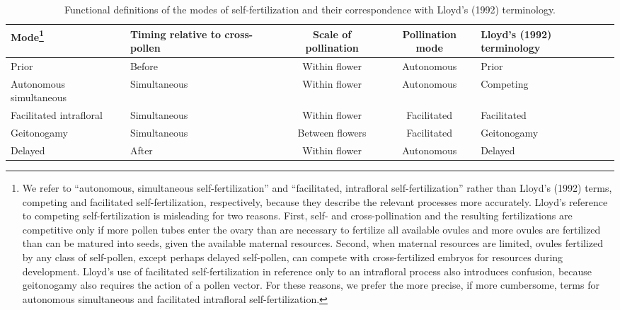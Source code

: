 \documentclass[letterpaper,titlepage]{scrartcl}
\begin{document}
\begin{table}[p]
\begin{minipage}{\textwidth}
  \begin{tabular}{p{2.3cm}p{3cm}ccp{3cm}}
    \hline
    Mode\footnote{We refer to ``autonomous, simultaneous
      self-fertilization'' and ``facilitated, intrafloral
      self-fertilization'' rather than Lloyd's (1992) terms, competing and
      facilitated self-fertilization, respectively, because they describe
      the relevant processes more accurately. Lloyd's reference to
      competing self-fertilization is misleading for two reasons. First,
      self- and cross-pollination and the resulting fertilizations are
      competitive only if more pollen tubes enter the ovary than are
      necessary to fertilize all available ovules and more ovules are
      fertilized than can be matured into seeds, given the available
      maternal resources. Second, when maternal resources are limited,
      ovules fertilized by any class of self-pollen, except perhaps
      delayed self-pollen, can compete with cross-fertilized embryos for
      resources during development. Lloyd's use of facilitated
      self-fertilization in reference only to an intrafloral process also
      introduces confusion, because geitonogamy also requires the action
      of a pollen vector. For these reasons, we prefer the more precise,
      if more cumbersome, terms for autonomous simultaneous and
      facilitated intrafloral self-fertilization.} & Timing relative to cross-pollen & Scale of pollination & Pollination mode & Lloyd's (1992) terminology\\
    \hline
    Prior & Before & Within flower & Autonomous & Prior\\
    Autonomous simultaneous & Simultaneous & Within flower & Autonomous & Competing\\
    Facilitated intrafloral & Simultaneous & Within flower & Facilitated & Facilitated\\
    Geitonogamy  & Simultaneous & Between flowers & Facilitated & Geitonogamy\\
    Delayed & After & Within flower & Autonomous & Delayed\\
    \hline
  \end{tabular}
  \caption{Functional definitions of the modes of self-fertilization and their correspondence with Lloyd's (1992) terminology.}
  \label{table:modes}
\end{minipage}
\end{table}
\end{document}
